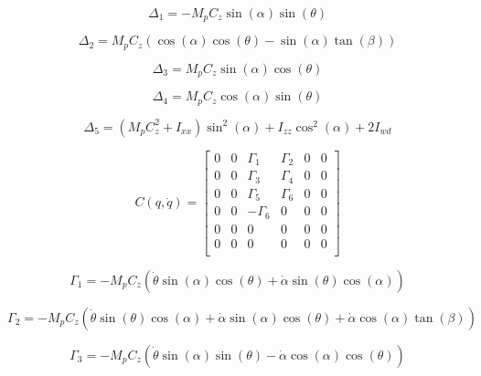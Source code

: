 \documentclass{article}
\begin{document}
\begin{equation}
\Delta_1=-M_pC_z\sin(\alpha)\sin(\theta)
\label{eq:4}
\end{equation}

\begin{equation}
    \Delta_2 = M_pC_z(\cos(\alpha)\cos(\theta)-\sin(\alpha)\tan(\beta))
    \label{eq:5}
\end{equation}

\begin{equation}
    \Delta_3=M_pC_z\sin(\alpha)\cos(\theta)
    \label{eq:6}
\end{equation}

\begin{equation}
    \Delta_4=M_pC_z\cos(\alpha)\sin(\theta)
    \label{eq:7}
\end{equation}

\begin{equation}
    \Delta_5=(M_pC_z^2+I_{xx})\sin^2(\alpha)+I_{zz}\cos^2(\alpha)+2I_{wd}
    \label{eq:8}
\end{equation}

\begin{equation}
    C(q,\dot{q})= \begin{bmatrix}
        0 & 0 & \Gamma_1 & \Gamma_2 & 0 & 0\\
        0 & 0 & \Gamma_3 & \Gamma_4 & 0 & 0\\
        0 & 0 & \Gamma_5 & \Gamma_6 & 0 & 0\\
        0 & 0 & -\Gamma_6 & 0 & 0 & 0\\
        0 & 0 & 0 & 0 & 0 & 0\\
        0 & 0 & 0 & 0 & 0 & 0\\
    \end{bmatrix}
    \label{eq:9}
\end{equation}

\begin{equation}
    \Gamma_1=-M_pC_z(\dot{\theta}\sin(\alpha)\cos(\theta)+\dot{\alpha}\sin(\theta)\cos(\alpha))
    \label{eq:10}
\end{equation}

\begin{equation}
    \Gamma_2=-M_pC_z(\dot{\theta}\sin(\theta)\cos(\alpha)+\dot{\alpha}\sin(\alpha)\cos(\theta)+\dot{\alpha}\cos(\alpha)\tan(\beta))
    \label{eq:11}
\end{equation}

\begin{equation}
    \Gamma_3=-M_pC_z(\dot{\theta}\sin(\alpha)\sin(\theta)-\dot{\alpha}\cos(\alpha)\cos(\theta))
    \label{eq:12}
\end{equation}
\end{document}
